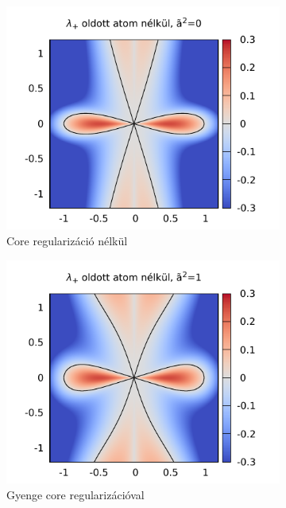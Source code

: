 \documentclass[10pt,a4paper]{scrartcl}
\begin{document}
\begin{figure}[h]
\centering
\begin{subfigure}[t]{0.495\linewidth}
\centering\includegraphics[scale=0.95]{"figs/lambda_k_surface_atsq=0"}
\caption{Core regularizáció nélkül}
\end{subfigure}
\begin{subfigure}[t]{0.495\linewidth}
\centering\includegraphics[scale=0.95]{"figs/lambda_k_surface_atsq=1"}
\caption{Gyenge core regularizációval}
\end{subfigure}
\begin{subfigure}[t]{0.495\linewidth}

\end{subfigure}
\end{figure}
\end{document}
